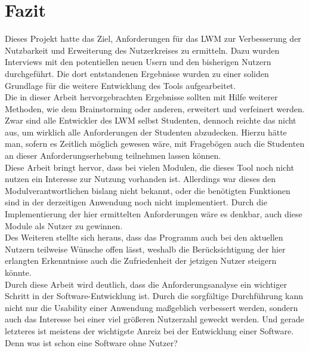 \chapter*{Fazit}

Dieses Projekt hatte das Ziel, Anforderungen für das \ac{LWM} zur Verbesserung der Nutzbarkeit und Erweiterung des Nutzerkreises zu ermitteln. Dazu wurden Interviews mit den potentiellen neuen Usern und den bisherigen Nutzern durchgeführt. Die dort entstandenen Ergebnisse wurden zu einer soliden Grundlage für die weitere Entwicklung des Tools aufgearbeitet.\\

Die in dieser Arbeit hervorgebrachten Ergebnisse sollten mit Hilfe weiterer Methoden, wie dem Brainstorming oder anderen, erweitert und verfeinert werden. Zwar sind alle Entwickler des \ac{LWM} selbst Studenten, dennoch reichte das nicht aus, um wirklich alle Anforderungen der Studenten abzudecken. Hierzu hätte man, sofern es Zeitlich möglich gewesen wäre, mit Fragebögen auch die Studenten an dieser Anforderungserhebung teilnehmen lassen können.\\

Diese Arbeit bringt hervor, dass bei vielen Modulen, die dieses Tool noch nicht nutzen ein Interesse zur Nutzung vorhanden ist. Allerdings war dieses den Modulverantwortlichen bislang nicht bekannt, oder die benötigten Funktionen sind in der derzeitigen Anwendung noch nicht implementiert. Durch die Implementierung der hier ermittelten Anforderungen wäre es denkbar, auch diese Module als Nutzer zu gewinnen.\\

Des Weiteren stellte sich heraus, dass das Programm auch bei den aktuellen Nutzern teilweise Wünsche offen lässt, weshalb die Berücksichtigung der hier erlangten Erkenntnisse auch die Zufriedenheit der jetzigen Nutzer steigern könnte. \\

Durch diese Arbeit wird deutlich, dass die Anforderungsanalyse ein wichtiger Schritt in der Software-Entwicklung ist. Durch die sorgfältige Durchführung kann nicht nur die Usability einer Anwendung maßgeblich verbessert werden, sondern auch das Interesse bei einer viel größeren Nutzerzahl geweckt werden. Und gerade letzteres ist meistens der wichtigste Anreiz bei der Entwicklung einer Software.\\
Denn was ist schon eine Software ohne Nutzer?